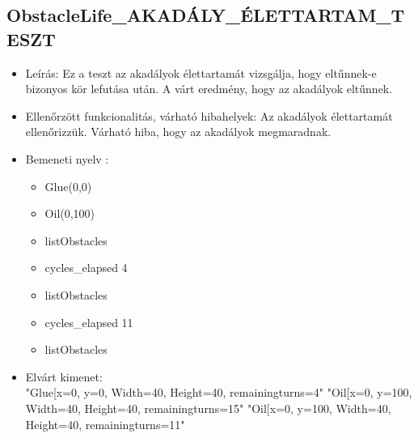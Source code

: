 \subsection{ObstacleLife\_AKADÁLY\_ÉLETTARTAM\_TESZT}
\begin{itemize}
	\item Leírás: Ez a teszt az akadályok élettartamát vizsgálja, hogy eltűnnek-e bizonyos kör lefutása után. A várt eredmény, hogy az akadályok eltűnnek.\newline
	\item  Ellenőrzött funkcionalitás, várható hibahelyek: Az akadályok élettartamát ellenőrizzük.
		   Várható hiba, hogy az akadályok megmaradnak.
	\item Bemeneti nyelv :
		\begin{itemize}
		\item Glue(0,0)
		\item Oil(0,100)
		\item listObstacles
		\item cycles\_elapsed 4
		\item listObstacles
		\item cycles\_elapsed 11
		\item listObstacles
		\end{itemize}
	
		\item Elvárt kimenet: \\
		"Glue[x=0, y=0, Width=40, Height=40, remainingturns=4"\newline
		"Oil[x=0, y=100, Width=40, Height=40, remainingturns=15"\newline
	    "Oil[x=0, y=100, Width=40, Height=40, remainingturns=11"\newline
			

		
\end{itemize}


\pagebreak
